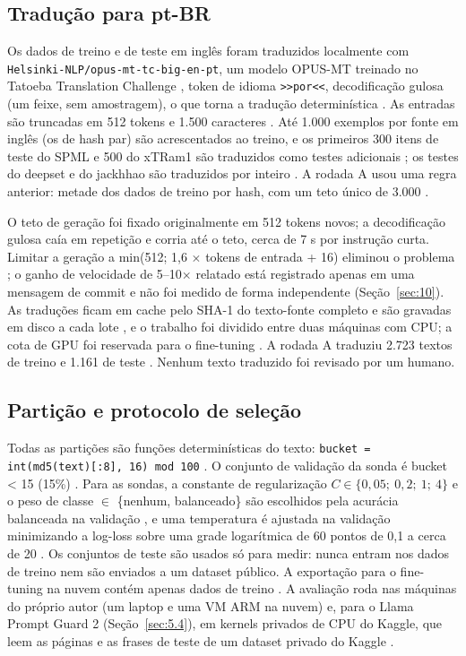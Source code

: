 \documentclass[11pt]{article}
\newcommand{\code}[1]{\texttt{#1}}
\begin{document}
\subsection{Tradução para pt-BR}\label{sec:3.2}

Os dados de treino e de teste em inglês foram traduzidos localmente com \code{Helsinki-\allowbreak{}NLP/\allowbreak{}opus-\allowbreak{}mt-\allowbreak{}tc-\allowbreak{}big-\allowbreak{}en-\allowbreak{}pt}, um modelo OPUS-MT treinado no Tatoeba Translation Challenge \citep{tiedemann2020opusmt, tiedemann2020tatoeba, helsinki2022opusmtenpt}, token de idioma \code{\textgreater{}\textgreater{}por\textless{}\textless{}}, decodificação gulosa (um feixe, sem amostragem), o que torna a tradução determinística%
. As entradas são truncadas em 512 tokens e 1.500 caracteres%
. Até 1.000 exemplos por fonte em inglês (os de hash par) são acrescentados ao treino, e os primeiros 300 itens de teste do SPML e 500 do xTRam1 são traduzidos como testes adicionais%
; os testes do deepset e do jackhhao são traduzidos por inteiro%
. A rodada A usou uma regra anterior: metade dos dados de treino por hash, com um teto único de 3.000%
.

O teto de geração foi fixado originalmente em 512 tokens novos; a decodificação gulosa caía em repetição e corria até o teto, cerca de 7 s por instrução curta. Limitar a geração a min(512; 1,6 \ensuremath{\times} tokens de entrada + 16) eliminou o problema%
; o ganho de velocidade de 5–10\ensuremath{\times} relatado está registrado apenas em uma mensagem de commit e não foi medido de forma independente (Seção~\ref{sec:10}). As traduções ficam em cache pelo SHA-1 do texto-fonte completo e são gravadas em disco a cada lote%
, e o trabalho foi dividido entre duas máquinas com CPU; a cota de GPU foi reservada para o fine-tuning%
. A rodada A traduziu 2.723 textos de treino e 1.161 de teste%
. Nenhum texto traduzido foi revisado por um humano.

\subsection{Partição e protocolo de seleção}\label{sec:3.3}

Todas as partições são funções determinísticas do texto: \code{bucket = int(md5(text)[:8], 16) mod 100}%
. O conjunto de validação da sonda é bucket \textless{} 15 (15\%)%
. Para as sondas, a constante de regularização $C \in \{0{,}05;\ 0{,}2;\ 1;\ 4\}$ e o peso de classe \ensuremath{\in} \{nenhum, balanceado\} são escolhidos pela acurácia balanceada na validação%
, e uma temperatura é ajustada na validação minimizando a log-loss sobre uma grade logarítmica de 60 pontos de 0,1 a cerca de 20%
. Os conjuntos de teste são usados só para medir: nunca entram nos dados de treino nem são enviados a um dataset público. A exportação para o fine-tuning na nuvem contém apenas dados de treino%
. A avaliação roda nas máquinas do próprio autor (um laptop e uma VM ARM na nuvem) e, para o Llama Prompt Guard 2 (Seção~\ref{sec:5.4}), em kernels privados de CPU do Kaggle, que leem as páginas e as frases de teste de um dataset privado do Kaggle%
.
\end{document}
